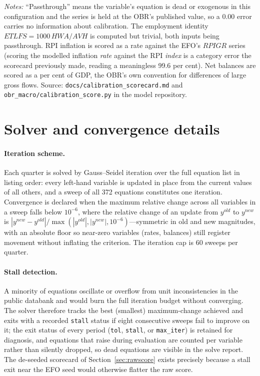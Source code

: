 \begin{table}[ht]
\medskip
\parbox{0.92\textwidth}{\footnotesize \emph{Notes:} ``Passthrough'' means the variable's equation is dead or exogenous in this configuration and the series is held at the OBR's published value, so a 0.00 error carries no information about calibration. The employment identity $ETLFS = 1000\,HWA/AVH$ is computed but trivial, both inputs being passthrough. RPI inflation is scored as a rate against the EFO's $RPIGR$ series (scoring the modelled inflation \emph{rate} against the RPI \emph{index} is a category error the scorecard previously made, reading a meaningless 99.6 per cent). Net balances are scored as a per cent of GDP, the OBR's own convention for differences of large gross flows. Source: \texttt{docs/calibration\_scorecard.md} and \texttt{obr\_macro/calibration\_score.py} in the model repository.}
\end{table}

\section{Solver and convergence details}
\label{app:solver}

\paragraph{Iteration scheme.} Each quarter is solved by Gauss--Seidel iteration over the full equation list in listing order: every left-hand variable is updated in place from the current values of all others, and a sweep of all 372 equations constitutes one iteration. Convergence is declared when the maximum relative change across all variables in a sweep falls below $10^{-6}$, where the relative change of an update from $y^{old}$ to $y^{new}$ is $|y^{new} - y^{old}| / \max(|y^{old}|, |y^{new}|, 10^{-6})$---symmetric in old and new magnitudes, with an absolute floor so near-zero variables (rates, balances) still register movement without inflating the criterion. The iteration cap is 60 sweeps per quarter.

\paragraph{Stall detection.} A minority of equations oscillate or overflow from unit inconsistencies in the public databank and would burn the full iteration budget without converging. The solver therefore tracks the best (smallest) maximum-change achieved and exits with a recorded \texttt{stall} status if eight consecutive sweeps fail to improve on it; the exit status of every period (\texttt{tol}, \texttt{stall}, or \texttt{max\_iter}) is retained for diagnosis, and equations that raise during evaluation are counted per variable rather than silently dropped, so dead equations are visible in the solve report. The de-seeded scorecard of Section~\ref{sec:rawscore} exists precisely because a stall exit near the EFO seed would otherwise flatter the raw score.

